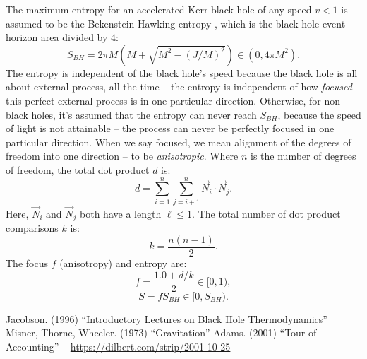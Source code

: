 \documentclass[12pt]{article}
\begin{document}
The maximum entropy for an accelerated Kerr black hole of any speed $v < 1$ is assumed to be the Bekenstein-Hawking entropy \cite{jacobson}, which is the black hole event horizon area divided by $4$:
\begin{equation}
S_{BH} = 2 \pi M \left(M + \sqrt{M^2 - (J/M)^2}\right) \in (0, 4\pi M^2).
\end{equation}
The entropy is independent of the black hole's speed because the black hole is all about external process, all the time -- the entropy is independent of how \textit{focused} this perfect external process is in one particular direction.
Otherwise, for non-black holes, it's assumed that the entropy can never reach $S_{BH}$, because the speed of light is not attainable -- the process can never be perfectly focused in one particular direction.
When we say focused, we mean alignment of the degrees of freedom into one direction -- to be \textit{anisotropic}.
Where $n$ is the number of degrees of freedom, the total dot product $d$ is:
\begin{equation}
d = \sum_{i = 1}^{n}  \sum_{j = i + 1}^{n} {\vec{N}}_i  \cdot {\vec{N}}_j.
\end{equation}
Here, ${\vec{N}}_i$ and ${\vec{N}}_j$ both have a length $\ell \leq 1$.
The total number of dot product comparisons $k$ is:
\begin{equation}
k = \frac{n(n - 1)}{2}.
\end{equation}
The focus $f$ (anisotropy) and entropy are:
\begin{equation}
f = \frac{1.0 + {d}/{k}}{2} \in [0, 1),
\end{equation}
\begin{equation}
S = f S_{BH} \in [0, S_{BH}).
\end{equation}



\begin{thebibliography}{9}
 Jacobson. (1996) ``Introductory Lectures on Black Hole Thermodynamics''
 Misner, Thorne, Wheeler. (1973) ``Gravitation''
 Adams. (2001) ``Tour of Accounting'' -- \url{https://dilbert.com/strip/2001-10-25}
\end{thebibliography}
\end{document}

